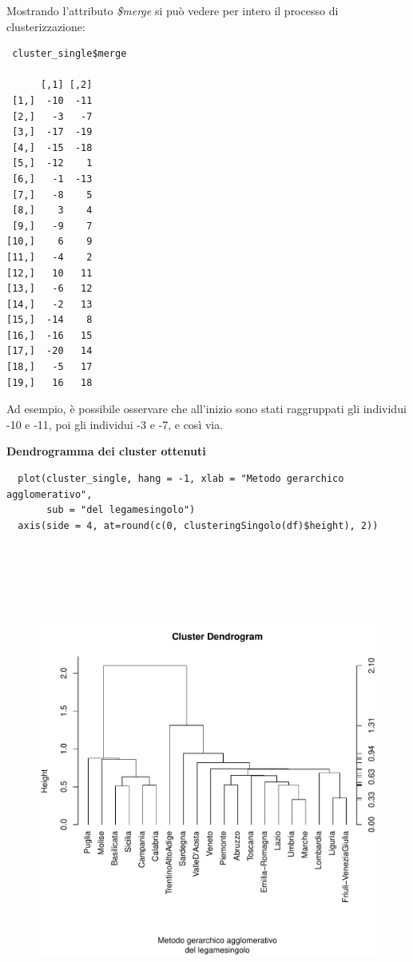 Mostrando l'attributo \textit{\$merge} si può vedere per intero il processo di clusterizzazione:

\vspace{5mm}
\begin{lstlisting}
 cluster_single$merge

      [,1] [,2]
 [1,]  -10  -11
 [2,]   -3   -7
 [3,]  -17  -19
 [4,]  -15  -18
 [5,]  -12    1
 [6,]   -1  -13
 [7,]   -8    5
 [8,]    3    4
 [9,]   -9    7
[10,]    6    9
[11,]   -4    2
[12,]   10   11
[13,]   -6   12
[14,]   -2   13
[15,]  -14    8
[16,]  -16   15
[17,]  -20   14
[18,]   -5   17
[19,]   16   18
\end{lstlisting}
\vspace{5mm}

Ad esempio, è possibile osservare che all'inizio sono stati raggruppati gli individui -10 e -11, poi gli individui -3 e -7, e così via.

\noindent \textbf{Dendrogramma dei cluster ottenuti}

\vspace{5mm}
\begin{lstlisting}
  plot(cluster_single, hang = -1, xlab = "Metodo gerarchico agglomerativo",
       sub = "del legamesingolo")
  axis(side = 4, at=round(c(0, clusteringSingolo(df)$height), 2))
\end{lstlisting}
\vspace{5mm}

\vspace{5mm}
\begin{figure}[!htbp]
    \centering
    \includegraphics[height=16cm]{ProgettoSAD/capitoli/images/clustering/dendro_cl_singolo.pdf}
\end{figure}
\vspace{5mm}
\newpage

